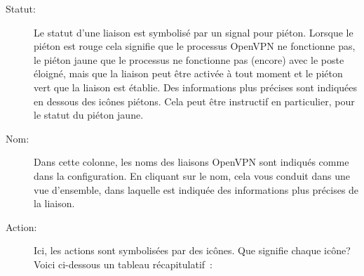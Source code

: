 \begin{description}
\item [Statut:] Le statut d'une liaison est symbolisé par un signal pour piéton.
  Lorsque le piéton est rouge cela signifie que le processus OpenVPN ne fonctionne
  pas, le piéton jaune que le processus ne fonctionne pas (encore) avec le poste
  éloigné, mais que la liaison peut être activée à tout moment et le piéton vert
  que la liaison est \flqq{}établie\frqq{}. Des informations plus précises sont
  indiquées en dessous des icônes piétons. Cela peut être instructif en
  particulier, pour le statut du piéton \flqq{}jaune\frqq{}.

\item [Nom:] Dans cette colonne, les noms des liaisons OpenVPN sont indiqués comme
  dans la configuration. En cliquant sur le nom, cela vous conduit dans une
  vue d'ensemble, dans laquelle est indiquée des informations plus précises de
  la liaison.

\item [Action:] Ici, les actions sont symbolisées par des icônes. Que signifie
  chaque icône? Voici ci-dessous un tableau récapitulatif~:


\end{description}
